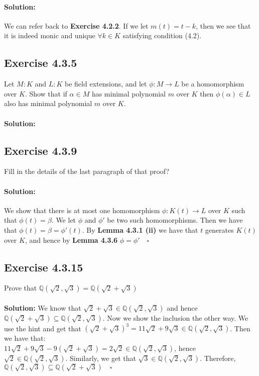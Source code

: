 \documentclass{article}
\begin{document}
\paragraph{Solution:}
We can refer back to \textbf{Exercise 4.2.2}.
If we let $m(t) = t - k$, then we see that it is indeed monic and unique $\forall k \in K$ satisfying condition (4.2).

\subsection*{Exercise 4.3.5}
Let $M:K$ and $L:K$ be field extensions, and let $\phi: M \rightarrow L$ be a homomorphism over $K$. Show that if $\alpha \in M$ has
minimal polynomial $m$ over $K$ then $\phi(\alpha) \in L$ also has minimal polynomial $m$ over $K$.
\\\\
\textbf{Solution:}

\subsection*{Exercise 4.3.9}
Fill in the details of the last paragraph of that proof?
\paragraph{Solution:}
We show that there is at most one homomorphism $\phi: K(t) \rightarrow L$ over $K$ such that $\phi(t)= \beta$.
We let $\phi$ and $\phi'$ be two such homomorphisms. Then we have that $\phi(t) = \beta = \phi'(t)$. By \textbf{Lemma 4.3.1 (ii)}
we have that $t$ generates $K(t)$ over $K$, and hence by \textbf{Lemma 4.3.6} $\phi = \phi' \quad \square$


\subsection*{Exercise 4.3.15}
Prove that $\mathbb{Q}(\sqrt 2, \sqrt 3) = \mathbb{Q}(\sqrt 2 + \sqrt 3)$
\\\\
\textbf{Solution:}
We know that $\sqrt2 + \sqrt3 \in \mathbb{Q}(\sqrt2, \sqrt3)$ and hence $\mathbb{Q}(\sqrt2 + \sqrt3) \subseteq \mathbb{Q}(\sqrt2 , \sqrt3)$. Now we show the inclusion the other way.
We use the hint and get that $(\sqrt2 + \sqrt3)^3 = 11\sqrt2 + 9\sqrt3 \in \mathbb{Q}(\sqrt2, \sqrt3)$. Then we have that:\\ $11\sqrt2 + 9\sqrt3 - 9(\sqrt2 + \sqrt3 ) = 2\sqrt2 \in \mathbb{Q}(\sqrt2, \sqrt3)$, 
hence $\sqrt2 \in \mathbb{Q}(\sqrt2, \sqrt3)$. Similarly, we get that $\sqrt3 \in \mathbb{Q}(\sqrt2, \sqrt3)$. Therefore, $\mathbb{Q}(\sqrt2, \sqrt3) \subseteq \mathbb{Q}(\sqrt2 + \sqrt3) \quad \square$
\end{document}
